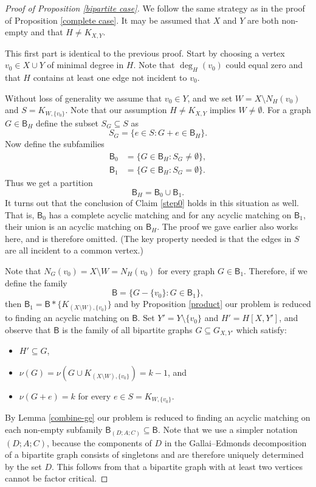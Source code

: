 \documentclass[10pt]{amsart}
\theoremstyle{definition}
\begin{document}
	\begin{proof}[Proof of Proposition \ref{bipartite case}] We follow the same strategy as in the proof of Proposition 
		\ref{complete case}. It may  be assumed that $X$ and $Y$ are both non-empty and that $H\neq K_{X,Y}$.
		
		This first part is identical to the previous proof.  
		Start by choosing a vertex $v_0 \in X\cup Y$ of minimal degree in $H$. Note that $\deg_H(v_0)$ could equal zero and that $H$ contains at least one edge not incident to $v_0$. 
		
		Without loss of generality we assume that $v_0\in Y$, and we set $W = X\setminus N_H(v_0)$ and $S = K_{W, \{v_0\}}$. Note that our assumption $H\neq K_{X,Y}$ implies $W\neq \emptyset$. For a graph $G\in \mathsf{B}_H$ define the subset $S_G\subseteq S$ as 
		\[S_G = \{e\in S : G+e \in \mathsf{B}_H\}.\]
		Now define the subfamilies 
		\begin{align*}
		\mathsf{B}_0 & = \{G\in \mathsf{B}_H : S_G \neq \emptyset \}, \\
		\mathsf{B}_1 & = \{G\in \mathsf{B}_H : S_G = \emptyset \} .
		\end{align*}
		Thus we get a partition
		\[\mathsf{B}_H = \mathsf{B}_0 \cup \mathsf{B}_1.\]
		It turns out that the conclusion of Claim \ref{step0} holds in this situation as well. That is, $\mathsf{B}_0$ has a complete acyclic matching and for any acyclic matching on $\mathsf{B}_1$, their union is an acyclic matching on $\mathsf{B}_H$. The proof we gave earlier also works here, and is therefore omitted. (The key property needed is that the edges in $S$ are all incident to a common vertex.)
		
		Note that $N_G(v_0) = X\setminus W = N_H(v_0)$ for every graph $G\in \mathsf{B}_1$. Therefore, if we
		define the family \[\mathsf{B} = \{G - \{v_0\} : G \in \mathsf{B}_1\},\]
		then $\mathsf{B}_1 = \mathsf{B} * \{K_{(X\setminus W), \{v_0\}}\}$ and by Proposition \ref{product} our problem is reduced to finding an acyclic matching on $\mathsf{B}$. Set $Y' = Y \setminus \{v_0\}$ and $H' = H[X,Y']$, and  observe that $\mathsf{B}$ is the family of all bipartite graphs $G\subseteq G_{X, Y'}$ which satisfy:
		\begin{itemize}
			\item $H' \subseteq G$,
			\item $\nu(G) = \nu(G\cup K_{(X\setminus W), \{v_0\}}) =  k - 1$, and
			\item $\nu(G+e) = k$ for every $e\in S = K_{W, \{v_0\}}$.
		\end{itemize}
		By Lemma \ref{combine-ge} our problem is reduced to finding an acyclic matching on each non-empty subfamily $\mathsf{B}_{(D; A; C)} \subseteq \mathsf{B}$. Note that we use a simpler notation $(D;A;C)$, because the components of $D$ in the Gallai--Edmonds decomposition of a bipartite graph consists of singletons and are therefore uniquely determined by the set $D$. This follows from that a bipartite graph with at least two vertices cannot be factor critical.
		

\end{proof}
\end{document}
